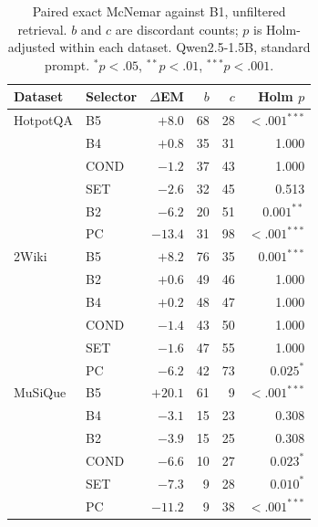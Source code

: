 \documentclass[conference]{IEEEtran}
\begin{document}
\begin{table}[t]
\centering
\caption{Paired exact McNemar against B1, unfiltered retrieval. $b$ and $c$ are
discordant counts; $p$ is Holm-adjusted within each dataset. Qwen2.5-1.5B,
standard prompt. $^{*}p<.05$, $^{**}p<.01$, $^{***}p<.001$.}
\label{tab:tests}
\setlength{\tabcolsep}{4pt}
\begin{tabular}{@{}llrrrr@{}}
\toprule
\textbf{Dataset} & \textbf{Selector} & $\Delta$\textbf{EM} & $b$ & $c$ & \textbf{Holm }$p$\\
\midrule
HotpotQA & B5   & $+8.0$  & 68 & 28 & $<.001^{***}$\\
         & B4   & $+0.8$  & 35 & 31 & 1.000\\
         & COND & $-1.2$  & 37 & 43 & 1.000\\
         & SET  & $-2.6$  & 32 & 45 & 0.513\\
         & B2   & $-6.2$  & 20 & 51 & $0.001^{**}$\\
         & PC   & $-13.4$ & 31 & 98 & $<.001^{***}$\\
\midrule
2Wiki    & B5   & $+8.2$  & 76 & 35 & $0.001^{***}$\\
         & B2   & $+0.6$  & 49 & 46 & 1.000\\
         & B4   & $+0.2$  & 48 & 47 & 1.000\\
         & COND & $-1.4$  & 43 & 50 & 1.000\\
         & SET  & $-1.6$  & 47 & 55 & 1.000\\
         & PC   & $-6.2$  & 42 & 73 & $0.025^{*}$\\
\midrule
MuSiQue  & B5   & $+20.1$ & 61 & \ 9 & $<.001^{***}$\\
         & B4   & $-3.1$  & 15 & 23 & 0.308\\
         & B2   & $-3.9$  & 15 & 25 & 0.308\\
         & COND & $-6.6$  & 10 & 27 & $0.023^{*}$\\
         & SET  & $-7.3$  & \ 9 & 28 & $0.010^{*}$\\
         & PC   & $-11.2$ & \ 9 & 38 & $<.001^{***}$\\
\bottomrule
\end{tabular}
\end{table}
\end{document}
